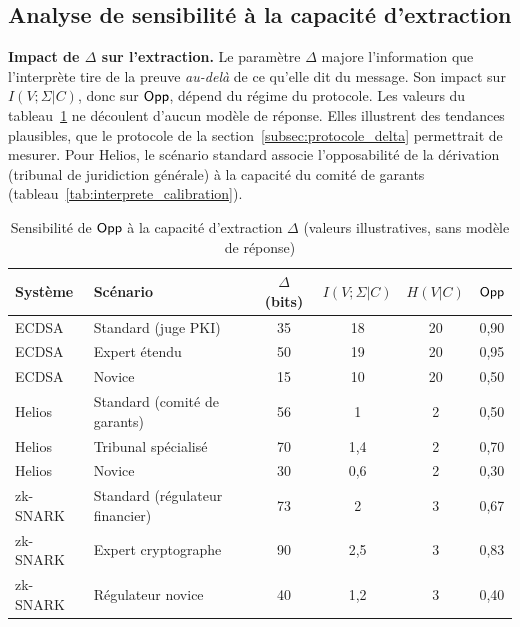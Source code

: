 \subsection{Analyse de sensibilit\'e \`a la capacit\'e d'extraction}
\label{subsec:analyse_sensibilite}
\begin{sloppypar}

\noindent\textbf{Impact de $\Delta$ sur l'extraction.} Le param\`etre
$\Delta$ majore l'information que l'interpr\`ete tire de la preuve
\emph{au-del\`a} de ce qu'elle dit du message. Son impact sur
$I(V;\Sigma|C)$, donc sur $\mathsf{Opp}$, d\'epend du r\'egime du protocole. Les
valeurs du tableau~\ref{tab:sensibilite_opp_delta} ne d\'ecoulent d'aucun mod\`ele
de r\'eponse. Elles illustrent des tendances plausibles, que le protocole de
la section~\ref{subsec:protocole_delta} permettrait de mesurer. Pour Helios, le sc\'enario standard
associe l'opposabilit\'e de la d\'erivation (tribunal de juridiction g\'en\'erale) \`a la capacit\'e
du comit\'e de garants (tableau~\ref{tab:interprete_calibration}).

\begin{table}[htbp]
\centering
\caption{Sensibilit\'e de $\mathsf{Opp}$ \`a la capacit\'e d'extraction $\Delta$ (valeurs illustratives, sans mod\`ele de r\'eponse)}
\label{tab:sensibilite_opp_delta}
\small
\begin{tabular}{@{}llcccc@{}}
\toprule
\textbf{Syst\`eme} & \textbf{Sc\'enario} & $\Delta$ (bits) & $I(V;\Sigma|C)$ & $H(V|C)$ & $\mathsf{Opp}$ \\
\midrule
ECDSA & Standard (juge PKI) & 35 & 18 & 20 & 0,90 \\
ECDSA & Expert \'etendu & 50 & 19 & 20 & 0,95 \\
ECDSA & Novice & 15 & 10 & 20 & 0,50 \\
\midrule
Helios & Standard (comit\'e de garants) & 56 & 1 & 2 & 0,50 \\
Helios & Tribunal sp\'ecialis\'e & 70 & 1,4 & 2 & 0,70 \\
Helios & Novice & 30 & 0,6 & 2 & 0,30 \\
\midrule
zk-SNARK & Standard (r\'egulateur financier) & 73 & 2 & 3 & 0,67 \\
zk-SNARK & Expert cryptographe & 90 & 2,5 & 3 & 0,83 \\
zk-SNARK & R\'egulateur novice & 40 & 1,2 & 3 & 0,40 \\
\bottomrule
\end{tabular}
\end{table}


\end{sloppypar}
